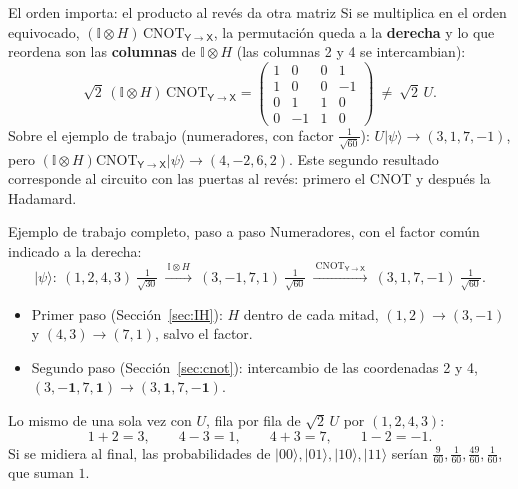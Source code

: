 \documentclass[11pt, a4paper, twoside, openright]{report}
\providecommand{\ket}[1]{|#1\rangle}
\newcommand{\X}{\mathsf{X}}
\newcommand{\Y}{\mathsf{Y}}
\newcommand{\CYX}{\mathrm{CNOT}_{\Y\to\X}}
\newcommand{\I}{\mathbb{I}}
\begin{document}
\begin{aclaracion}{El orden importa: el producto al revés da otra matriz}
Si se multiplica en el orden equivocado, $(\I\otimes H)\,\CYX$, la permutación queda a la \textbf{derecha} y lo que reordena son las \textbf{columnas} de $\I\otimes H$ (las columnas 2 y 4 se intercambian):
\[
\sqrt2\,(\I\otimes H)\,\CYX=\begin{pmatrix} 1&0&0&1\\1&0&0&-1\\0&1&1&0\\0&-1&1&0\end{pmatrix}
\ \neq\ \sqrt2\,U.
\]
Sobre el ejemplo de trabajo (numeradores, con factor $\frac{1}{\sqrt{60}}$): $U\ket\psi\to(3,1,7,-1)$, pero $(\I\otimes H)\CYX\ket\psi\to(4,-2,6,2)$. Este segundo resultado corresponde al circuito con las puertas al revés: primero el CNOT y después la Hadamard.
\end{aclaracion}

\begin{ejemplo}{Ejemplo de trabajo completo, paso a paso}
Numeradores, con el factor común indicado a la derecha:
\[
\ket\psi:\ (1,2,4,3)\ \tfrac{1}{\sqrt{30}}
\ \xrightarrow{\ \I\otimes H\ }\ (3,-1,7,1)\ \tfrac{1}{\sqrt{60}}
\ \xrightarrow{\ \CYX\ }\ (3,1,7,-1)\ \tfrac{1}{\sqrt{60}}.
\]
\begin{itemize}
  \item Primer paso (Sección~\ref{sec:IH}): $H$ dentro de cada mitad, $(1,2)\to(3,-1)$ y $(4,3)\to(7,1)$, salvo el factor.
  \item Segundo paso (Sección~\ref{sec:cnot}): intercambio de las coordenadas 2 y 4, $(3,\mathbf{-1},7,\mathbf{1})\to(3,\mathbf{1},7,\mathbf{-1})$.
\end{itemize}
Lo mismo de una sola vez con $U$, fila por fila de $\sqrt2\,U$ por $(1,2,4,3)$:
\[
1+2=3,\qquad 4-3=1,\qquad 4+3=7,\qquad 1-2=-1.
\]
Si se midiera al final, las probabilidades de $\ket{00},\ket{01},\ket{10},\ket{11}$ serían $\frac{9}{60},\frac{1}{60},\frac{49}{60},\frac{1}{60}$, que suman $1$.
\end{ejemplo}
\end{document}

